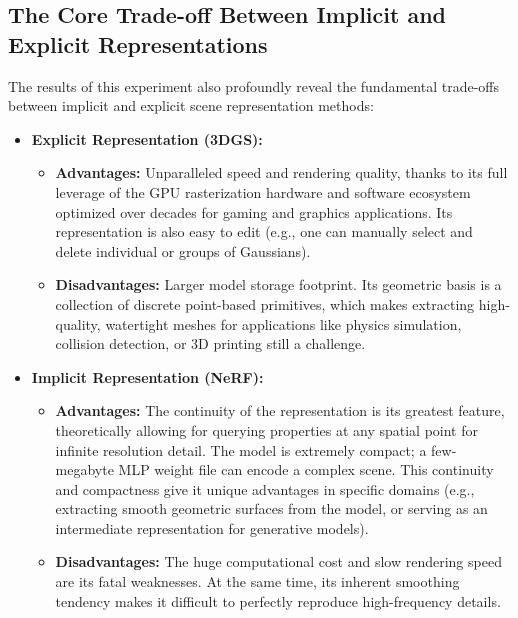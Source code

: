 \documentclass[11pt]{article}
\begin{document}
\subsection{The Core Trade-off Between Implicit and Explicit Representations}
The results of this experiment also profoundly reveal the fundamental trade-offs between implicit and explicit scene representation methods:
\begin{itemize}
    \item \textbf{Explicit Representation (3DGS):}
        \begin{itemize}
            \item \textbf{Advantages:} Unparalleled speed and rendering quality, thanks to its full leverage of the GPU rasterization hardware and software ecosystem optimized over decades for gaming and graphics applications. Its representation is also easy to edit (e.g., one can manually select and delete individual or groups of Gaussians).
            \item \textbf{Disadvantages:} Larger model storage footprint. Its geometric basis is a collection of discrete point-based primitives, which makes extracting high-quality, watertight meshes for applications like physics simulation, collision detection, or 3D printing still a challenge.
        \end{itemize}
    \item \textbf{Implicit Representation (NeRF):}
        \begin{itemize}
            \item \textbf{Advantages:} The continuity of the representation is its greatest feature, theoretically allowing for querying properties at any spatial point for infinite resolution detail. The model is extremely compact; a few-megabyte MLP weight file can encode a complex scene. This continuity and compactness give it unique advantages in specific domains (e.g., extracting smooth geometric surfaces from the model, or serving as an intermediate representation for generative models).
            \item \textbf{Disadvantages:} The huge computational cost and slow rendering speed are its fatal weaknesses. At the same time, its inherent smoothing tendency makes it difficult to perfectly reproduce high-frequency details.
        \end{itemize}
\end{itemize}
\end{document}
